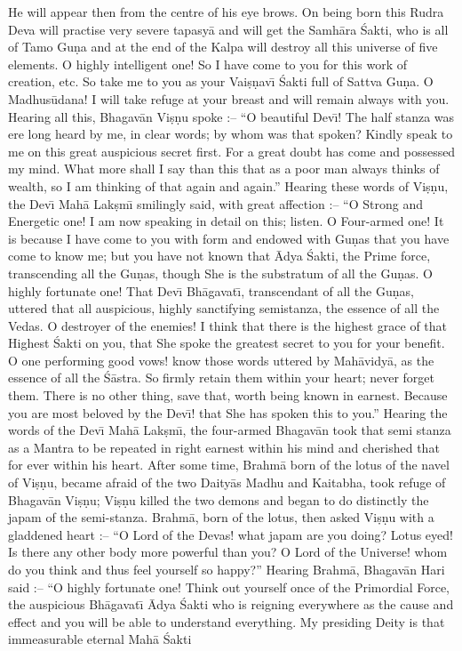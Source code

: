 He will appear then from the centre of his eye brows. On being born this Rudra Deva will practise very severe tapasy\=a and will get the Samh\=ara \'Sakti, who is all of Tamo Gu\d{n}a and at the end of the Kalpa will destroy all this universe of five elements. O highly intelligent one! So I have come to you for this work of creation, etc. So take me to you as your Vai\d{s}\d{n}av\={\i} \'Sakti full of Sattva Gu\d{n}a. O Madhus\=udana! I will take refuge at your breast and will remain always with you. Hearing all this, Bhagav\=an Vi\d{s}\d{n}u spoke :-- ``O beautiful Dev\={\i}! The half stanza was ere long heard by me, in clear words; by whom was that spoken? Kindly speak to me on this great auspicious secret first. For a great doubt has come and possessed my mind. What more shall I say than this that as a poor man always thinks of wealth, so I am thinking of that again and again.'' Hearing these words of Vi\d{s}\d{n}u, the Dev\={\i} Mah\=a Lak\d{s}m\={\i} smilingly said, with great affection :-- ``O Strong and Energetic one! I am now speaking in detail on this; listen. O Four-armed one! It is because I have come to you with form and endowed with Gu\d{n}as that you have come to know me; but you have not known that \=Adya \'Sakti, the Prime force, transcending all the Gu\d{n}as, though She is the substratum of all the Gu\d{n}as. O highly fortunate one! That Dev\={\i} Bh\=agavat\={\i}, transcendant of all the Gu\d{n}as, uttered that all auspicious, highly sanctifying semistanza, the essence of all the Vedas. O destroyer of the enemies! I think that there is the highest grace of that Highest \'Sakti on you, that She spoke the greatest secret to you for your benefit. O one performing good vows! know those words uttered by Mah\=avidy\=a, as the essence of all the \'S\=astra. So firmly retain them within your heart; never forget them. There is no other thing, save that, worth being known in earnest. Because you are most beloved by the Dev\={\i}! that She has spoken this to you.'' Hearing the words of the Dev\={\i} Mah\=a Lak\d{s}m\={\i}, the four-armed Bhagav\=an took that semi stanza as a Mantra to be repeated in right earnest within his mind and cherished that for ever within his heart. After some time, Brahm\=a born of the lotus of the navel of Vi\d{s}\d{n}u, became afraid of the two Daity\=as Madhu and Kaitabha, took refuge of Bhagav\=an Vi\d{s}\d{n}u; Vi\d{s}\d{n}u killed the two demons and began to do distinctly the japam of the semi-stanza. Brahm\=a, born of the lotus, then asked Vi\d{s}\d{n}u with a gladdened heart :-- ``O Lord of the Devas! what japam are you doing? Lotus eyed! Is there any other body more powerful than you? O Lord of the Universe! whom do you think and thus feel yourself so happy?'' Hearing Brahm\=a, Bhagav\=an Hari said :-- ``O highly fortunate one! Think out yourself once of the Primordial Force, the auspicious Bh\=agavat\={\i} \=Adya \'Sakti who is reigning everywhere as the cause and effect and you will be able to understand everything. My presiding Deity is that immeasurable eternal Mah\=a \'Sakti

